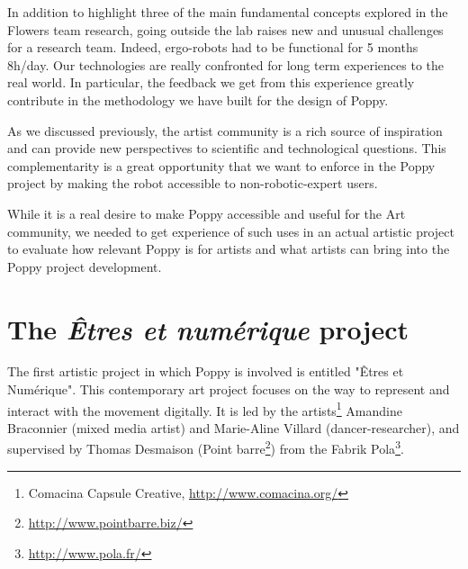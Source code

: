 
\begin{figure}[]
\centering
    \hfil
    \caption{}
    \label{fig:ergo_robot}
\end{figure}

In addition to highlight three of the main fundamental concepts explored in the Flowers team research, going outside the lab raises new and unusual challenges for a research team. Indeed, ergo-robots had to be functional for 5 months 8h/day. Our technologies are really confronted for long term experiences to the real world. In particular, the feedback we get from this experience greatly contribute in the methodology we have built for the design of Poppy.


As we discussed previously, the artist community is a rich source of inspiration and can provide new perspectives to scientific and technological questions. This complementarity is a great opportunity that we want to enforce in the Poppy project by making the robot accessible to non-robotic-expert users.

While it is a real desire to make Poppy accessible and useful for the Art community, we needed to get experience of such uses in an actual artistic project to evaluate how relevant Poppy is for artists and what artists can bring into the Poppy project development.

\section{The \emph{Êtres et numérique} project} %

The first artistic project in which Poppy is involved is entitled "Êtres et Numérique". This contemporary art project focuses on the way to represent and interact with the movement digitally. It is led by the artists\footnote{Comacina Capsule Creative, \url{http://www.comacina.org/}} Amandine Braconnier (mixed media artist) and Marie-Aline Villard (dancer-researcher), and supervised by Thomas Desmaison (Point barre\footnote{\url{http://www.pointbarre.biz/}}) from the Fabrik Pola\footnote{\url{http://www.pola.fr/}}.

